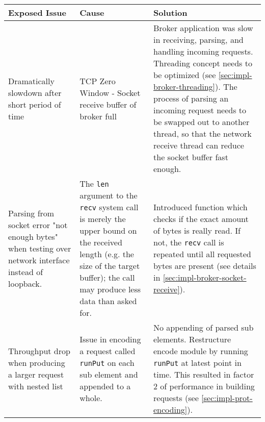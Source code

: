 \begin{table}[H]
\begin{tabular}{|p{4cm}|p{5cm}|p{6cm}|}
\hline
{\bf Exposed Issue}                                                                                  & {\bf Cause}                                                                                                                                                                                                                 & {\bf Solution}                                                                                                                                                                                                                                                                                    \\ \hline
Dramatically slowdown after short period of time                                                       & TCP Zero Window - Socket receive buffer of broker full                                                                                                                                                                      & Broker application was slow in receiving, parsing, and handling incoming requests. Threading concept needs to be optimized (see \ref{sec:impl-broker-threading}). The process of parsing an incoming request needs to be swapped out to another thread, so that the network receive thread can reduce the socket buffer fast enough. \\ \hline
Parsing from socket error "not enough bytes" when testing over network
interface instead of loopback. & The \lstinline{len} argument to the
\lstinline{recv} system call is merely the upper bound on the received length
(e.g. the size of the target buffer); the call may produce less data than asked
for. & Introduced function which checks if the exact amount of bytes is really
read. If not, the \lstinline{recv} call is repeated until all requested bytes are present (see details in \ref{sec:impl-broker-socket-receive}).                                                                                                                                              \\ \hline
Throughput drop when producing a larger request with nested list
& Issue in encoding a request called \lstinline{runPut} on each sub element and
appended to a whole.
& No appending of parsed sub elements. Restructure encode module by running
\lstinline{runPut} at latest point in time. This resulted in factor 2 of performance in building requests (see \ref{sec:impl-prot-encoding}).                                                                                                                                      \\ \hline

\end{tabular}
\end{table}
